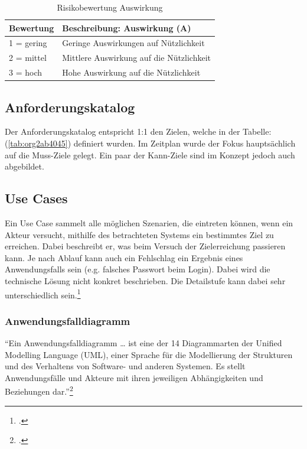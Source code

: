 \begin{table}[H]
\centering
\begin{tabular}{l|l}
\textbf{Bewertung} & \textbf{Beschreibung: Auswirkung (A)}\\
\hline
1 = gering & Geringe Auswirkungen auf Nützlichkeit\\
2 = mittel & Mittlere Auswirkung auf die Nützlichkeit\\
3 = hoch & Hohe Auswirkung auf die Nützlichkeit\\
\end{tabular}
\caption{\label{tab:org8a27a35}
Risikobewertung Auswirkung}

\end{table}

\newpage
\subsection{Anforderungskatalog}
\label{sec:org90be6e5}

Der Anforderungskatalog entspricht 1:1 den Zielen, welche in der
Tabelle:(\ref{tab:org2ab4045}) definiert wurden. Im Zeitplan wurde der Fokus
hauptsächlich auf die Muss-Ziele gelegt. Ein paar der Kann-Ziele sind im
Konzept jedoch auch abgebildet.

\subsection{Use Cases}
\label{sec:orgfd94eff}

Ein Use Case sammelt alle möglichen Szenarien, die eintreten können,
wenn ein Akteur versucht, mithilfe des betrachteten Systems ein
bestimmtes Ziel zu erreichen. Dabei beschreibt er, was beim Versuch der
Zielerreichung passieren kann. Je nach Ablauf kann auch ein Fehlschlag
ein Ergebnis eines Anwendungsfalls sein (e.g. falsches Passwort beim
Login). Dabei wird die technische Lösung nicht konkret beschrieben.
Die Detailstufe kann dabei sehr unterschiedlich sein.\footcite{usecase}

\subsubsection{Anwendungsfalldiagramm}
\label{sec:org1c2414b}

"`Ein Anwendungsfalldiagramm \ldots{} ist eine der 14 Diagrammarten der
Unified Modelling Language (UML), einer Sprache für die Modellierung
der Strukturen und des Verhaltens von Software- und anderen Systemen.
Es stellt Anwendungsfälle und Akteure mit ihren jeweiligen
Abhängigkeiten und Beziehungen dar."'\footcite{usecasediagramm}

